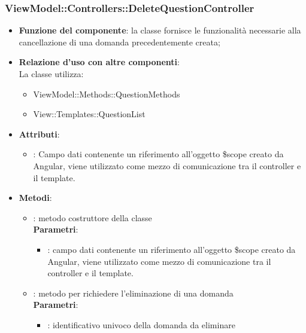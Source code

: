 \subsubsection{ViewModel::Controllers::DeleteQuestionController}
\begin{itemize}
\item\textbf{Funzione del componente}: la classe fornisce le funzionalità necessarie alla cancellazione di una domanda precedentemente creata;
	\item\textbf{Relazione d'uso con altre componenti}: \\
La classe utilizza:
	\begin{itemize}
		\item ViewModel::Methods::QuestionMethods
		\item View::Templates::QuestionList
	\end{itemize}
\item\textbf{Attributi}:
	\begin{itemize}
		\item{}: Campo dati contenente un riferimento all’oggetto \$scope creato da Angular, viene utilizzato come mezzo di comunicazione tra il controller e il template.\\

	\end{itemize}
\item\textbf{Metodi}:
	\begin{itemize}
		\item{}: metodo costruttore della classe\\
		\textbf{Parametri}:
			\begin{itemize}
				\item{}: campo dati contenente un riferimento all’oggetto \$scope creato da Angular, viene utilizzato come mezzo di comunicazione tra il controller e il template.\\
			\end{itemize}
		\item{}: metodo per richiedere l'eliminazione di una domanda\\
		\textbf{Parametri}:
			\begin{itemize}
				\item{}: identificativo univoco della domanda da eliminare\\
			\end{itemize}
	\end{itemize}
\end{itemize}

